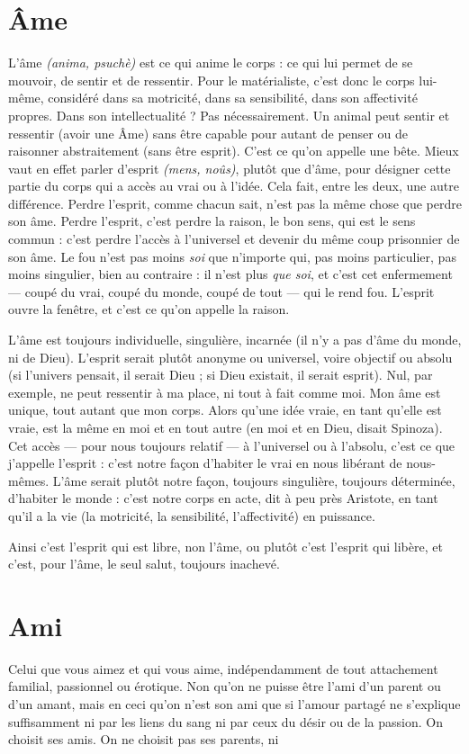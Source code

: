 \section{Âme}
L'âme {\it (anima, psuchè)} est ce qui anime le corps : ce qui lui permet de se
mouvoir, de sentir et de ressentir. Pour le matérialiste, c’est donc le
corps lui-même, considéré dans sa motricité, dans sa sensibilité, dans son affectivité
propres. Dans son intellectualité ? Pas nécessairement. Un animal peut
sentir et ressentir (avoir une Âme) sans être capable pour autant de penser ou de
raisonner abstraitement (sans être esprit). C’est ce qu’on appelle une bête.
Mieux vaut en effet parler d'esprit {\it (mens, noûs)}, plutôt que d’âme, pour désigner
cette partie du corps qui a accès au vrai ou à l’idée. Cela fait, entre les
deux, une autre différence. Perdre l'esprit, comme chacun sait, n’est pas la
même chose que perdre son âme. Perdre l'esprit, c’est perdre la raison, le bon
sens, qui est le sens commun : c’est perdre l'accès à l’universel et devenir du
même coup prisonnier de son âme. Le fou n’est pas moins {\it soi} que n'importe
qui, pas moins particulier, pas moins singulier, bien au contraire : il n'est plus
{\it que soi}, et c’est cet enfermement — coupé du vrai, coupé du monde, coupé de
tout — qui le rend fou. L'esprit ouvre la fenêtre, et c’est ce qu’on appelle la
raison.

L'âme est toujours individuelle, singulière, incarnée (il n’y a pas d’âme du
monde, ni de Dieu). L'esprit serait plutôt anonyme ou universel, voire objectif
ou absolu (si l’univers pensait, il serait Dieu ; si Dieu existait, il serait esprit).
Nul, par exemple, ne peut ressentir à ma place, ni tout à fait comme moi. Mon
âme est unique, tout autant que mon corps. Alors qu’une idée vraie, en tant
qu’elle est vraie, est la même en moi et en tout autre (en moi et en Dieu, disait
Spinoza). Cet accès — pour nous toujours relatif — à l’universel ou à l'absolu,
c’est ce que j'appelle l'esprit : c’est notre façon d’habiter le vrai en nous libérant
de nous-mêmes. L'âme serait plutôt notre façon, toujours singulière, toujours
déterminée, d’habiter le monde : c’est notre corps en acte, dit à peu près Aristote,
en tant qu’il a la vie (la motricité, la sensibilité, l’affectivité) en puissance.

Ainsi c’est l'esprit qui est libre, non l’âme, ou plutôt c’est l'esprit qui libère,
et c’est, pour l’âme, le seul salut, toujours inachevé.

\section{Ami}
Celui que vous aimez et qui vous aime, indépendamment de tout attachement
familial, passionnel ou érotique. Non qu'on ne puisse être
l'ami d’un parent ou d’un amant, mais en ceci qu’on n'est son ami que si
l'amour partagé ne s'explique suffisamment ni par les liens du sang ni par ceux
du désir ou de la passion. On choisit ses amis. On ne choisit pas ses parents, ni

